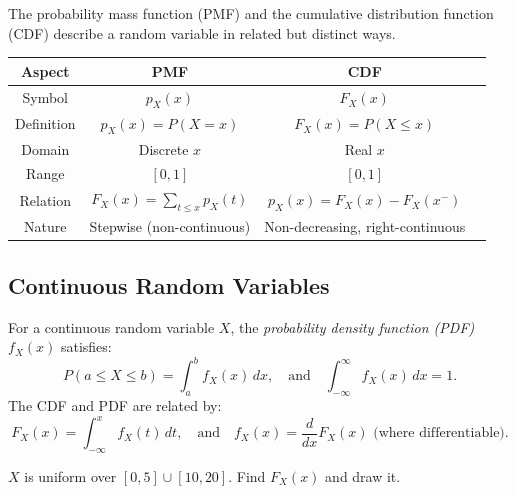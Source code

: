 \begin{remark}
The probability mass function (PMF) and the cumulative distribution function (CDF) describe a random variable in related but distinct ways.

\begin{center}
\renewcommand{\arraystretch}{1.2}
\begin{tabular}{c|ccc}
\hline
\textbf{Aspect} & \textbf{PMF} & \textbf{CDF} \\ \hline
Symbol & $p_X(x)$ & $F_X(x)$ \\ \hline
Definition & $p_X(x)=P(X=x)$ & $F_X(x)=P(X\le x)$ \\ \hline
Domain & Discrete $x$ & Real $x$ \\ \hline
Range & $[0,1]$ & $[0,1]$ \\ \hline
Relation & $F_X(x)=\sum_{t\le x}p_X(t)$ & $p_X(x)=F_X(x)-F_X(x^-)$ \\ \hline
Nature & Stepwise (non-continuous) & Non-decreasing, right-continuous \\ \hline
\end{tabular}
\end{center}
\end{remark}

\subsection{Continuous Random Variables}

\begin{definition}
    For a continuous random variable \(X\), the \emph{probability density function (PDF)} \(f_X(x)\) satisfies:
    \[
        P(a \le X \le b) = \int_a^b f_X(x) \, dx, \quad \text{and} \quad \int_{-\infty}^{\infty} f_X(x) \, dx = 1.
    \]
    The CDF and PDF are related by:
    \[
        F_X(x) = \int_{-\infty}^x f_X(t) \, dt, \quad \text{and} \quad f_X(x) = \frac{d}{dx} F_X(x) \text{ (where differentiable)}.
    \]
\end{definition}


\begin{exercise}
$X$ is uniform over $[0,5] \cup [10,20]$. Find $F_X(x)$ and draw it.
\end{exercise}

